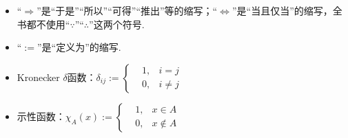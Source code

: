 \begin{itemize}
    \item “\(\Longrightarrow\)”是“于是”“所以”“可得”“推出”等的缩写；“\(\Longleftrightarrow\)”是“当且仅当”的缩写，全书都不使用“\(\because\)”“\(\therefore\)”这两个符号.
    \item “\(:=\)”是“定义为”的缩写.
    \item Kronecker \(\delta\)函数：\(\delta_{ij}:=\left\{\begin{aligned} & 1, & i=j \\ & 0, &i \neq j \end{aligned}\right.\)
    \item 示性函数：\(\chi_A(x) := \left\{\begin{aligned} & 1, & x \in A \\ & 0, &x \not \in A \end{aligned}\right.\) 
\end{itemize}
